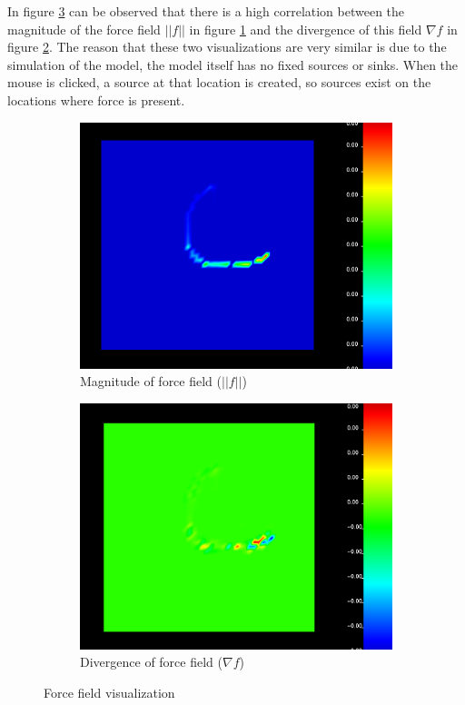 In figure \ref{fig:force_field} can be observed that there is a high correlation between the magnitude of the force field $||f||$ in figure \ref{fig:force_mag} and the divergence of this field $\nabla f$ in figure \ref{fig:div_force}.
The reason that these two visualizations are very similar is due to the simulation of the model, the model itself has no fixed sources or sinks. 
When the mouse is clicked, a source at that location is created, so sources exist on the locations where force is present.
\begin{figure}[htb]
    \centering
    \begin{subfigure}[htb]{.49\textwidth}
        \includegraphics[width =\textwidth]{content/pictures/force_magnitude.png}
        \caption{Magnitude of force field ($||f||$)}
        \label{fig:force_mag}
    \end{subfigure}
    \begin{subfigure}[htb]{.49\textwidth}
        \includegraphics[width =\textwidth]{content/pictures/div_force.png}
        \caption{Divergence of force field ($\nabla f$) }
        \label{fig:div_force}
    \end{subfigure}
    \caption{Force field visualization}
    \label{fig:force_field}
\end{figure}


\clearpage